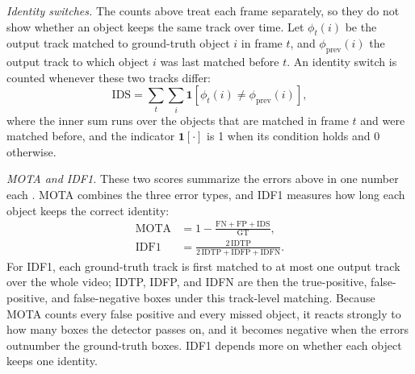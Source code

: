 \emph{Identity switches.} The counts above treat each frame separately, so they do not show whether an object keeps the same track over time. Let $\phi_t(i)$ be the output track matched to ground-truth object $i$ in frame $t$, and $\phi_{\mathrm{prev}}(i)$ the output track to which object $i$ was last matched before $t$. An identity switch is counted whenever these two tracks differ:
\begin{equation}
\mathrm{IDS}=\sum_t\sum_{i}\mathbf{1}\!\left[\phi_t(i)\neq\phi_{\mathrm{prev}}(i)\right],
\label{eq:bg-ids}
\end{equation}
where the inner sum runs over the objects that are matched in frame $t$ and were matched before, and the indicator $\mathbf{1}[\cdot]$ is 1 when its condition holds and 0 otherwise.

\emph{MOTA and IDF1.} These two scores summarize the errors above in one number each \cite{bernardin2008clear,ristani2016idf1}. MOTA combines the three error types, and IDF1 measures how long each object keeps the correct identity:
\begin{align}
\mathrm{MOTA}&=1-\frac{\mathrm{FN}+\mathrm{FP}+\mathrm{IDS}}{\mathrm{GT}},\label{eq:bg-mota}\\
\mathrm{IDF1}&=\frac{2\,\mathrm{IDTP}}{2\,\mathrm{IDTP}+\mathrm{IDFP}+\mathrm{IDFN}}.\label{eq:bg-idf1}
\end{align}
For IDF1, each ground-truth track is first matched to at most one output track over the whole video; IDTP, IDFP, and IDFN are then the true-positive, false-positive, and false-negative boxes under this track-level matching. Because MOTA counts every false positive and every missed object, it reacts strongly to how many boxes the detector passes on, and it becomes negative when the errors outnumber the ground-truth boxes. IDF1 depends more on whether each object keeps one identity.

